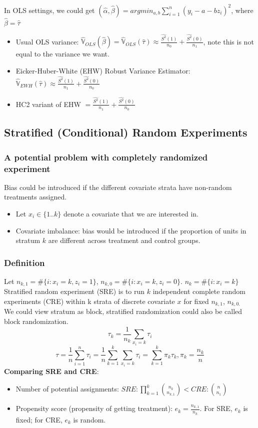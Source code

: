 \begin{itemize}
    In OLS settings, we could get $(\hat{\alpha}, \hat{\beta}) = argmin_{a, b}\sum_{i = 1}^{n} (y_i - a - bz_i)^2$, where $\hat{\beta} = \hat{\tau}$
    \begin{itemize}
        \item Usual OLS variance: $\hat{\mathbb{V}}_{OLS}(\hat{\beta}) = \hat{\mathbb{V}}_{OLS}(\hat{\tau}) \approx \frac{\hat{S^{2}}(1)}{n_0} + \frac{\hat{S^{2}}(0)}{n_1}$, note this is not equal to the variance we want. 
        \item Eicker-Huber-White (EHW) Robust Variance Estimator: $\hat{\mathbb{V}}_{EWH}(\hat{\tau}) \approx \frac{\hat{S^{2}}(1)}{n_1} + \frac{\hat{S^{2}}(0)}{n_0}$
        \item HC2 variant of EHW $= \frac{\hat{S^{2}}(1)}{n_1} + \frac{\hat{S^{2}}(0)}{n_0}$
    \end{itemize}
\end{itemize}

\subsection{Stratified (Conditional) Random Experiments}
\subsubsection{A potential problem with completely randomized experiment}
Bias could be introduced if the different covariate strata have non-random treatments assigned. 
\begin{itemize}
    \item Let $x_i \in \{1..k\}$ denote a covariate that we are interested in.
    \item Covariate imbalance: bias would be introduced if the proportion of units in stratum $k$ are different across treatment and control groups. 
\end{itemize}
\subsubsection{Definition}
Let $n_{k, 1} = \# \{i: x_i = k, z_i = 1\}$, $n_{k, 0} = \# \{i: x_i = k, z_i = 0\}$. $n_{k} = \# \{i: x_i = k\}$ \\
Stratified random experiment (SRE) is to run $k$ independent complete random experiments (CRE) within k strata of discrete covariate $x$ for fixed $n_{k, 1}$, $n_{k, 0.}$ \\
We could view stratum as block, stratified randomization could also be called block randomization. \\
$$\tau_{k} = \frac{1}{n_k}\sum_{x_i = k} \tau_{i}$$
$$\tau = \frac{1}{n}\sum_{i = 1}^{n}\tau_i = \frac{1}{n}\sum_{k = 1}^{k}\sum_{x_i = k}\tau_i = \sum_{k = 1}^{k}\pi_{k}\tau_{k}, \pi_k = \frac{n_k}{n}$$
\textbf{Comparing SRE and CRE}:
\begin{itemize}
    \item Number of potential assignments: $SRE: \prod_{k = 1}^{k} \binom{n_k}{n_{k, 1}} < CRE: \binom{n}{n_1}$
    \item Propensity score (propensity of getting treatment): $e_k = \frac{n_{k, 1}}{n_k}$. For SRE, $e_k$ is fixed; for CRE, $e_k$ is random.
\end{itemize}

